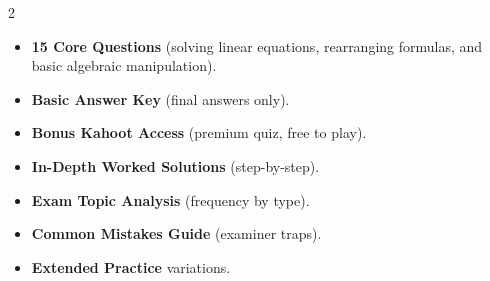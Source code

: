 \documentclass[11pt,a4paper]{article}
\newcommand{\FullReleaseDate}{April 30, 2026}
\begin{document}
\vspace{8pt}

\begin{multicols}{2}
  \begin{tcolorbox}[card, title=\sffamily\bfseries\textcolor{white}{\faHandPointDown\ TODAY (Simplified Version)}, colbacktitle=mainblue, boxed title style={sharp corners, boxrule=0pt}]
    \begin{itemize}[leftmargin=1.2em, itemsep=2pt]
      \item \small \textbf{15 Core Questions} (solving linear equations, rearranging formulas, and basic algebraic manipulation).
      \item \small \textbf{Basic Answer Key} (final answers only).
      \item \small \textbf{Bonus Kahoot Access} (premium quiz, free to play).
    \end{itemize}
  \end{tcolorbox}

  \columnbreak

  \begin{tcolorbox}[card, title=\sffamily\bfseries\textcolor{white}{\faRocket\ ON \FullReleaseDate\ (Full Upgrade)}, colbacktitle=mainblue, boxed title style={sharp corners, boxrule=0pt}]
    \begin{itemize}[leftmargin=1.2em, itemsep=2pt]
      \item \small \textbf{In-Depth Worked Solutions} (step-by-step).
      \item \small \textbf{Exam Topic Analysis} (frequency by type).
      \item \small \textbf{Common Mistakes Guide} (examiner traps).
      \item \small \textbf{Extended Practice} variations.
    \end{itemize}
  \end{tcolorbox}
\end{multicols}
\end{document}
